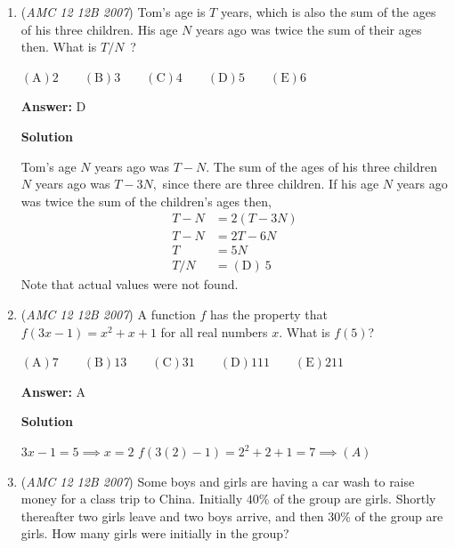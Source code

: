 \begin{enumerate}
 Since $A$ and $B$ are \href{https://artofproblemsolving.com/wiki/index.php?title=Right\_angle}{right angles}, and $AE$ equals $BC$, and $AECB$ is a \href{https://artofproblemsolving.com/wiki/index.php?title=Square}{square}. Since the length of $ED$ and $CD$ are also 5, triangle $CDE$ is \href{https://artofproblemsolving.com/wiki/index.php?title=Equilateral\_triangle}{equilateral}. Angle $E$ is therefore $90+60=150 \Rightarrow \mathrm {(E)}$



	\item (\textit{AMC 12 12B 2007}) Tom's age is $T$ years, which is also the sum of the ages of his three children. His age $N$ years ago was twice the sum of their ages then. What is $T/N$ ? 


 $\mathrm {(A)} 2\qquad \mathrm {(B)} 3\qquad \mathrm {(C)} 4\qquad \mathrm {(D)} 5\qquad \mathrm {(E)} 6$

 \textbf{Answer: }D



\textbf{Solution}

Tom's age $N$ years ago was $T-N$. The sum of the ages of his three children $N$ years ago was $T-3N,$ since there are three children. If his age $N$ years ago was twice the sum of the children's ages then,
 \begin{align*}T-N&=2(T-3N)\\ T-N&=2T-6N\\ T&=5N\\ T/N&=\boxed{\mathrm{(D) \ } 5}\end{align*}
Note that actual values were not found.

 


	\item (\textit{AMC 12 12B 2007}) A function $f$ has the property that $f(3x-1)=x^2+x+1$ for all real numbers $x$. What is $f(5)$?


 $\mathrm {(A)} 7\qquad \mathrm {(B)} 13\qquad \mathrm {(C)} 31\qquad \mathrm {(D)} 111\qquad \mathrm {(E)} 211$

 \textbf{Answer: }A



\textbf{Solution}

$3x-1 =5 \implies x= 2$
$f(3(2)-1) = 2^2+2+1=7 \implies (A)$



	\item (\textit{AMC 12 12B 2007}) Some boys and girls are having a car wash to raise money for a class trip to China. Initially $40$\% of the group are girls. Shortly thereafter two girls leave and two boys arrive, and then $30$\% of the group are girls. How many girls were initially in the group?



\end{enumerate}
